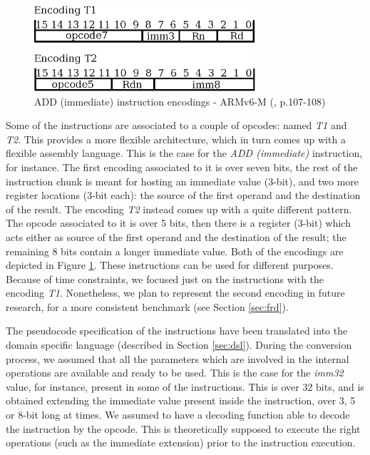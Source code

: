 \documentclass[conference]{IEEEtran}
\begin{document}
\begin{figure}[ht!]
\begin{center}
	\includegraphics[width=8.2cm]{IMG/encodings.eps}
	\caption{ADD (immediate) instruction encodings - ARMv6-M (\cite{armManual}, p.107-108)}
	\label{fig:ADDEnc}
\end{center}
\end{figure}

Some of the instructions are associated to a couple of opcodes: named \textit{T1} and
\textit{T2}. This provides a more flexible architecture, which in turn comes up with a
flexible assembly language. This is the case for the \textit{ADD (immediate)} instruction,
for instance. The first encoding associated to it is over seven bits, the rest of the
instruction chunk is meant for hosting an immediate value (3-bit), and two more register
locations (3-bit each): the source of the first operand and the destination of the result.
The encoding \textit{T2} instead comes up with a quite different pattern. The opcode
associated to it is over 5 bits, then there is a register (3-bit) which acts either as source
of the first operand and the destination of the result; the remaining 8 bits contain a longer
immediate value. Both of the encodings are depicted in Figure \ref{fig:ADDEnc}. These
instructions can be used for different purposes. Because of time constraints, we focused just
on the instructions with the encoding \textit{T1}. Nonetheless, we plan to represent the
second encoding in future research, for a more consistent benchmark (see Section
\ref{sec:frd}).

The pseudocode specification of the instructions have been translated into the domain
specific language (described in Section \ref{sec:dsl}). During the conversion process, we
assumed that all the parameters which are involved in the internal operations are available
and ready to be used. This is the case for the \textit{imm32} value, for instance, present in
some of the instructions. This is over 32 bits, and is obtained extending the immediate value
present inside the instruction, over 3, 5 or 8-bit long at times. We assumed to have a
decoding function able to decode the instruction by the opcode. This is theoretically
supposed to execute the right operations (such as the immediate extension) prior to the
instruction execution.
\end{document}
